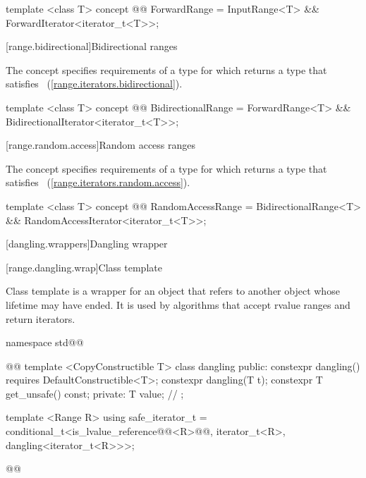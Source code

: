 {\begin{codeblock}
template <class T>
concept @@ ForwardRange =
  InputRange<T> && ForwardIterator<iterator_t<T>>;
\end{codeblock}

[range.bidirectional]{Bidirectional ranges}

\pnum
The  concept specifies requirements of a
 type for which  returns a type that satisfies
~(\ref{range.iterators.bidirectional}).

\begin{codeblock}
template <class T>
concept @@ BidirectionalRange =
  ForwardRange<T> && BidirectionalIterator<iterator_t<T>>;
\end{codeblock}

[range.random.access]{Random access ranges}

\pnum
The  concept specifies requirements of a
 type for which  returns a type that satisfies
~(\ref{range.iterators.random.access}).

\begin{codeblock}
template <class T>
concept @@ RandomAccessRange =
  BidirectionalRange<T> && RandomAccessIterator<iterator_t<T>>;
\end{codeblock}

[dangling.wrappers]{Dangling wrapper}

[range.dangling.wrap]{Class template }

\pnum
{}%
Class template  is a wrapper for an object that refers to another object whose
lifetime may have ended. It is used by algorithms that accept rvalue ranges and return iterators.

\begin{codeblock}
namespace std@@ { @@
  template <CopyConstructible T>
  class dangling {
  public:
    constexpr dangling() requires DefaultConstructible<T>;
    constexpr dangling(T t);
    constexpr T get_unsafe() const;
  private:
    T value; // \expos
  };

  template <Range R>
  using safe_iterator_t =
    conditional_t<is_lvalue_reference@@<R>@@,
      iterator_t<R>,
      dangling<iterator_t<R>>>;
}@\oldtxt{\}\}\}}@
\end{codeblock}

}
